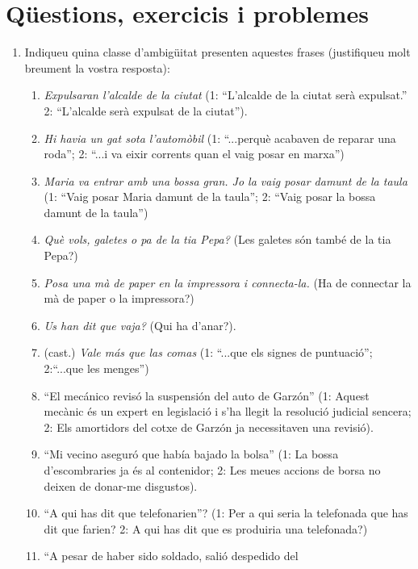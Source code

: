 \section{Qüestions, exercicis i problemes}

\begin{enumerate}
\item Indiqueu quina classe d'ambigüitat presenten aquestes
      frases (justifiqueu molt breument la vostra resposta):
      \begin{enumerate}
      \item \emph{Expulsaran l'alcalde de la ciutat} (1:
             ``L'alcalde de la ciutat serà expulsat.'' 
             2: ``L'alcalde serà expulsat de la ciutat'').
      \item \emph{Hi havia un gat sota l'automòbil} (1: ``...perquè
        acabaven de reparar una roda''; 2: ``...i va eixir corrents
        quan el vaig posar en marxa'')
      \item \emph{Maria va entrar amb una bossa gran. Jo la vaig posar damunt de
          la taula} (1: ``Vaig posar Maria damunt de la taula''; 2:
        ``Vaig posar la bossa damunt de la taula'')
      \item \emph{Què vols, galetes o pa de la tia Pepa?} (Les galetes
        són també de la tia Pepa?)
      \item \emph{Posa una mà de paper en la impressora i
          connecta-la.} (Ha de connectar la mà de paper o la
        impressora?)
      \item \emph{Us han dit que vaja?} (Qui ha d'anar?).
      \item (cast.) \emph{Vale más que las comas} (1: ``...que els signes de
        puntuació''; 2:``...que les menges'')
      \item ``El mecánico revisó la suspensión del auto de Garzón''
        (1: Aquest mecànic és un expert en legislació i s'ha llegit
        la resolució judicial sencera; 2: Els amortidors del cotxe de
        Garzón ja necessitaven una revisió). 
      \item ``Mi vecino aseguró que había bajado la bolsa'' (1:
        La bossa d'escombraries ja és al contenidor; 2: Les meues
        accions de borsa no deixen de donar-me disgustos).
      \item ``A qui has dit que telefonarien''?  (1: Per a qui seria
        la telefonada que has dit que farien? 2: A qui has dit que es
        produiria una telefonada?)
      \item ``A pesar de haber sido soldado, salió despedido del

\end{enumerate}
\end{enumerate}
